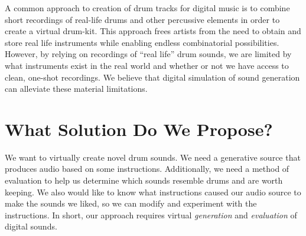 \documentclass[\main/thesis.tex]{subfiles}
\begin{document}
A common approach to creation of drum tracks for digital music is to combine short recordings of real-life drums and other percussive elements in order to create a virtual drum-kit. This approach frees artists from the need to obtain and store real life instruments while enabling endless combinatorial possibilities. However, by relying on recordings of \enquote{real life} drum sounds, we are limited by what instruments exist in the real world and whether or not we have access to clean, one-shot recordings. We believe that digital simulation of sound generation can alleviate these material limitations. 
 
\section{What Solution Do We Propose?}
We want to virtually create novel drum sounds. We need a generative source that produces audio based on some instructions. Additionally, we need a method of evaluation to help us determine which sounds resemble drums and are worth keeping. We also would like to know what instructions caused our audio source to make the sounds we liked, so we can modify and experiment with the instructions. In short, our approach requires virtual \textit{generation} and \textit{evaluation} of digital sounds.   
\end{document}
